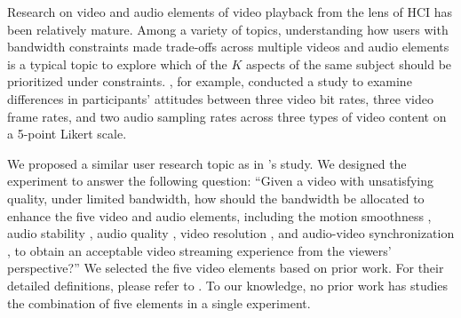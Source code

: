 Research on video and audio elements of video playback from the lens of HCI has been relatively mature. Among a variety of topics, understanding how users with bandwidth constraints made trade-offs across multiple videos and audio elements \cite{molnar2013comedy, oeldorf2012bad} is a typical topic to explore which of the $K$ aspects of the same subject should be prioritized under constraints. \textcite{oeldorf2012bad}, for example, conducted a study to examine differences in participants' attitudes between three video bit rates, three video frame rates, and two audio sampling rates across three types of video content on a 5-point Likert scale. 

We proposed a similar user research topic as in \textcite{oeldorf2012bad}'s study. We designed the experiment to answer the following question: ``Given a video with unsatisfying quality, under limited bandwidth, how should the bandwidth be allocated to enhance the five video and audio elements, including the motion smoothness \cite{huynh2008temporal}, audio stability \cite{hardman1998successful}, audio quality \cite{knoche2008low}, video resolution \cite{knoche2005can}, and audio-video synchronization \cite{steinmetz1996human}, to obtain an acceptable video streaming experience from the viewers' perspective?'' We selected the five video elements based on prior work. For their detailed definitions, please refer to . To our knowledge, no prior work has studies the combination of five elements in a single experiment.

